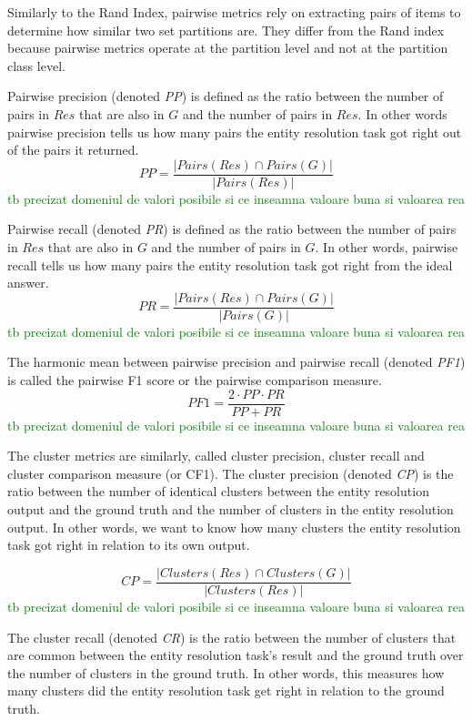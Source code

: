 \documentclass[journal]{IEEEtran}
\begin{document}
    Similarly to the Rand Index, pairwise metrics rely on extracting pairs of
    items to determine how similar two set partitions are.
    They differ from the Rand index because pairwise metrics operate at the
    partition level and not at the partition class level.
    
    Pairwise precision (denoted \textit{PP}) is defined as the ratio between the
    number of pairs in $Res$ that are also in $G$ and the number of pairs in
    $Res$.
    In other words pairwise precision tells us how many pairs the entity
    resolution task got right out of the pairs it returned.
    \[
        PP = \frac{|Pairs(Res) \cap Pairs(G)|}{|Pairs(Res)|}
    \]
    \textcolor{green}{tb precizat domeniul de valori posibile si ce inseamna valoare buna si valoarea rea}

    Pairwise recall (denoted \textit{PR}) is defined as the ratio between the
    number of pairs in $Res$ that are also in $G$ and the number of pairs in $G$.
    In other words, pairwise recall tells us how many pairs the entity
    resolution task got right from the ideal answer.
    \[
        PR = \frac{|Pairs(Res) \cap Pairs(G)|}{|Pairs(G)|}
    \]
    \textcolor{green}{tb precizat domeniul de valori posibile si ce inseamna valoare buna si valoarea rea}

    The harmonic mean between pairwise precision and pairwise recall (denoted
    \textit{PF1}) is called the pairwise F1 score or the pairwise comparison
    measure\cite{Men10}.
    \[
        PF1=\frac{2 \cdot PP \cdot PR}{PP + PR}
    \]
    \textcolor{green}{tb precizat domeniul de valori posibile si ce inseamna valoare buna si valoarea rea}

    The cluster metrics are similarly, called cluster precision, cluster recall and
    cluster comparison measure (or CF1).
    The cluster precision (denoted \textit{CP}) is the ratio between the number
    of identical clusters between the entity resolution output and the ground
    truth and the number of clusters in the entity resolution output.
    In other words, we want to know how many clusters the entity resolution task
    got right in relation to its own output.

    \[
        CP=\frac{|Clusters(Res) \cap Clusters(G)|}{|Clusters(Res)|}
    \]
    \textcolor{green}{tb precizat domeniul de valori posibile si ce inseamna valoare buna si valoarea rea}

    The cluster recall (denoted \textit{CR}) is the ratio between the number of
    clusters that are common between the entity resolution task's result and
    the ground truth over the number of clusters in the ground truth.
    In other words, this measures how many clusters did the entity resolution
    task get right in relation to the ground truth.
\end{document}
